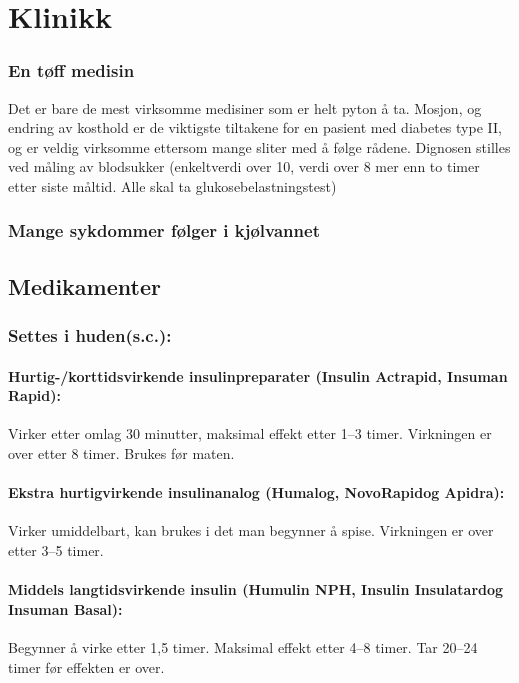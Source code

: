 		\section{Klinikk}
			\subsubsection{En tøff medisin}
				Det er bare de mest virksomme medisiner som er helt pyton å ta. Mosjon, og endring av kosthold er de viktigste tiltakene for en pasient med diabetes type II, og er veldig virksomme ettersom mange sliter med å følge rådene. Dignosen stilles ved måling av blodsukker (enkeltverdi over 10, verdi over 8 mer enn to timer etter siste måltid. Alle skal ta glukosebelastningstest)
			\subsubsection{Mange sykdommer følger i kjølvannet}
		\subsection{Medikamenter\cite{legevakthandboka}}
				\subsubsection{Settes i huden(s.c.):}
					\paragraph{Hurtig-/korttidsvirkende insulinpreparater (Insulin Actrapid\textregistered, Insuman Rapid\textregistered):\\}Virker etter omlag 30 minutter, maksimal effekt etter 1–3 timer. Virkningen er over etter 8 timer. Brukes før maten.

					\paragraph{Ekstra hurtigvirkende insulinanalog (Humalog\textregistered, NovoRapid\textregistered og Apidra\textregistered):}Virker  umiddelbart, kan brukes i det man begynner å spise. Virkningen er over etter 3–5 timer.

					\paragraph{Middels langtidsvirkende insulin (Humulin NPH\textregistered, Insulin Insulatard\textregistered og Insuman Basal\textregistered):\\}Begynner å virke etter 1,5 timer. Maksimal effekt etter 4–8 timer. Tar 20–24 timer før effekten er over.


